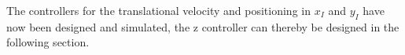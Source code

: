 \begin{minipage}{\linewidth}
\begin{minipage}{0.46\linewidth}
\begin{figure}[H]
            \centering
            \label{fig:positionControllersXYAction}
        \end{figure}
    \end{minipage}
\end{minipage}

The controllers for the translational velocity and positioning in $x_I$ and $y_I$ have now been designed and simulated, the z controller can thereby be designed in the following section.
